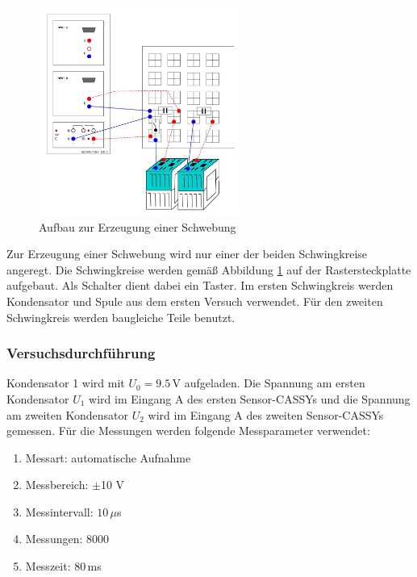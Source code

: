 \begin{figure}[H]
\centering
\includegraphics[width=0.6\textwidth]{bilder/aufbau_schwebung.jpg}
\caption{Aufbau zur Erzeugung einer Schwebung}
\label{abb:aufbau_schweb}
\end{figure}

Zur Erzeugung einer Schwebung wird nur einer der beiden Schwingkreise angeregt. Die Schwingkreise werden gemäß Abbildung \ref{abb:aufbau_schweb} auf der Rastersteckplatte aufgebaut. Als Schalter dient dabei ein Taster. Im ersten Schwingkreis werden Kondensator und Spule aus dem ersten Versuch verwendet. Für den zweiten Schwingkreis werden baugleiche Teile benutzt.


\subsubsection{Versuchsdurchführung}

Kondensator 1 wird mit $U_0 = 9.5 \, \mathrm V$ aufgeladen. Die Spannung am ersten Kondensator $U_1$ wird im Eingang A des ersten Sensor-CASSYs und die Spannung am zweiten Kondensator $U_2$ wird im Eingang A des zweiten Sensor-CASSYs gemessen. Für die Messungen werden folgende Messparameter verwendet:

\begin{enumerate}[-]
\setlength{\itemsep}{-5pt} 
\item Messart: automatische Aufnahme
\item Messbereich: $\pm$10 V
\item Messintervall: $10\,\mu$s 
\item Messungen: $8000$
\item Messzeit: $80\,$ms
\end{enumerate}

